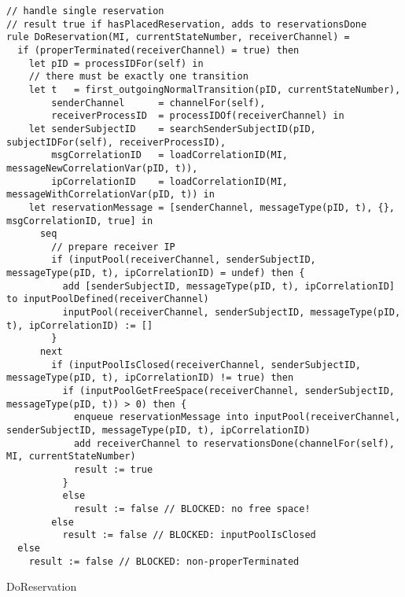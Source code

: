 \begin{listing}[H]
\begin{verbatim}
// handle single reservation
// result true if hasPlacedReservation, adds to reservationsDone
rule DoReservation(MI, currentStateNumber, receiverChannel) =
  if (properTerminated(receiverChannel) = true) then
    let pID = processIDFor(self) in
    // there must be exactly one transition
    let t   = first_outgoingNormalTransition(pID, currentStateNumber),
        senderChannel      = channelFor(self),
        receiverProcessID  = processIDOf(receiverChannel) in
    let senderSubjectID    = searchSenderSubjectID(pID, subjectIDFor(self), receiverProcessID),
        msgCorrelationID   = loadCorrelationID(MI, messageNewCorrelationVar(pID, t)),
        ipCorrelationID    = loadCorrelationID(MI, messageWithCorrelationVar(pID, t)) in
    let reservationMessage = [senderChannel, messageType(pID, t), {}, msgCorrelationID, true] in
      seq
        // prepare receiver IP
        if (inputPool(receiverChannel, senderSubjectID, messageType(pID, t), ipCorrelationID) = undef) then {
          add [senderSubjectID, messageType(pID, t), ipCorrelationID] to inputPoolDefined(receiverChannel)
          inputPool(receiverChannel, senderSubjectID, messageType(pID, t), ipCorrelationID) := []
        }
      next
        if (inputPoolIsClosed(receiverChannel, senderSubjectID, messageType(pID, t), ipCorrelationID) != true) then
          if (inputPoolGetFreeSpace(receiverChannel, senderSubjectID, messageType(pID, t)) > 0) then {
            enqueue reservationMessage into inputPool(receiverChannel, senderSubjectID, messageType(pID, t), ipCorrelationID)
            add receiverChannel to reservationsDone(channelFor(self), MI, currentStateNumber)
            result := true
          }
          else
            result := false // BLOCKED: no free space!
        else
          result := false // BLOCKED: inputPoolIsClosed
  else
    result := false // BLOCKED: non-properTerminated
\end{verbatim}
\caption{DoReservation}
\label{lst:asm:DoReservation}
\end{listing}




